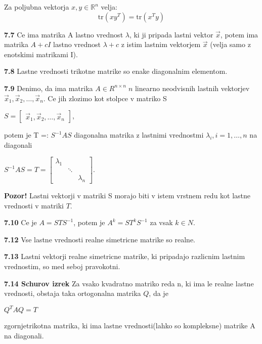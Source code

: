 \documentclass{article}
\begin{document}
\begin{multicols}{2}
	Za poljubna vektorja \( x,y \in \mathbb{R}^n \) velja:
	\[
		\text{tr} (xy^T) = \text{tr}(x^Ty)
	\]


	\textbf{7.7} Ce ima matrika A lastno vrednost $\lambda$, ki ji pripada lastni vektor $\vec{x}$,
	potem ima matrika $A + cI$ lastno vrednost $\lambda + c$ z istim lastnim vektorjem $\vec{x}$ (velja samo z
	enotskimi matrikami I).

	\textbf{7.8} Lastne vrednosti trikotne matrike so enake diagonalnim elementom.

	\textbf{7.9} Denimo, da ima matrika $A \in R^{n \times n}\; n$ linearno neodvisnih lastnih vektorjev
	$\vec{x}_{1}, \vec{x}_{2}, \dots, \vec{x}_{n}$. Ce jih zlozimo kot stolpce v matriko S
	\begin{center}
		\begin{math}
			S =
			\begin{bmatrix}
				\vec{x}_{1}, \vec{x}_{2}, \dots, \vec{x}_{n}
			\end{bmatrix}
		\end{math},
	\end{center}
	potem je T =: $S^{-1}AS$ diagonalna matrika z lastnimi vrednostmi $\lambda_{i}, i = 1, \dots, n$ na diagonali
	\begin{center}
		\begin{math}
			S^{-1}AS = T =
			\begin{bmatrix}
				\lambda_{1} &        &             \\
				            & \ddots &             \\
				            &        & \lambda_{n}
			\end{bmatrix}
		\end{math}.
	\end{center}

	\textbf{Pozor!} Lastni vektorji v matriki S morajo biti v istem vrstnem redu kot lastne vrednosti v matriki $T$.

	\textbf{7.10} Ce je $A = STS^{-1}$, potem je $A^{k} = ST^{k}S^{-1}$ za vsak $k \in N$.

	\textbf{7.12} Vse lastne vrednosti realne simetricne matrike so realne.

	\textbf{7.13} Lastni vektorji realne simetricne matrike, ki pripadajo razlicnim lastnim
	vrednostim, so med seboj pravokotni.

	\textbf{7.14 Schurov izrek} Za vsako kvadratno matriko reda n, ki ima le realne lastne vrednosti,
	obstaja taka ortogonalna matrika $Q$, da je
	\begin{center}
		\begin{math}
			Q^{T}AQ = T
		\end{math}
	\end{center}
	zgornjetrikotna matrika, ki ima lastne vrednosti(lahko so kompleksne) matrike A na diagonali.


\end{multicols}
\end{document}
